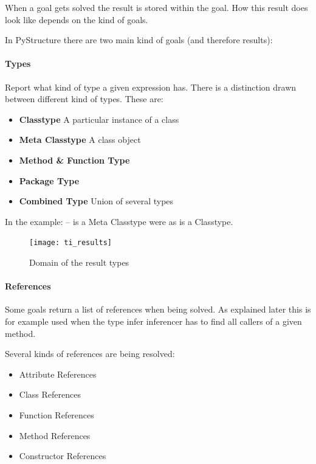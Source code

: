 \documentclass[12pt,halfparskip,DIV11,BCOR10mm]{scrreprt}
\begin{document}
When a goal gets solved the result is stored within the goal. How this result does look like depends on the kind of goals. 

In PyStructure there are two main kind of goals (and therefore results):

\paragraph{Types}

Report what kind of type a given expression has. There is a distinction drawn between different kind of types. These are:

\begin{itemize}
    \item \textbf{Classtype} A particular instance of a class
    \item \textbf{Meta Classtype} A class object
    \item \textbf{Method \& Function Type}
    \item \textbf{Package Type}
    \item \textbf{Combined Type} Union of several types
\end{itemize}

In the example:  –  is a Meta Classtype were as  is a Classtype.


\begin{figure}[H]
    \centering
    \texttt{[image: ti\_results]}
    \label{fig:ti_results}
    \caption{Domain of the result types}
\end{figure}

\paragraph{References}

Some goals return a list of references when being solved. As explained later this is for example used when the type infer inferencer has to find all callers of a given method.

Several kinds of references are being resolved:

\begin{itemize}
	\item Attribute References
	\item Class References
	\item Function References
	\item Method References
	\item Constructor References
\end{itemize}
\end{document}
